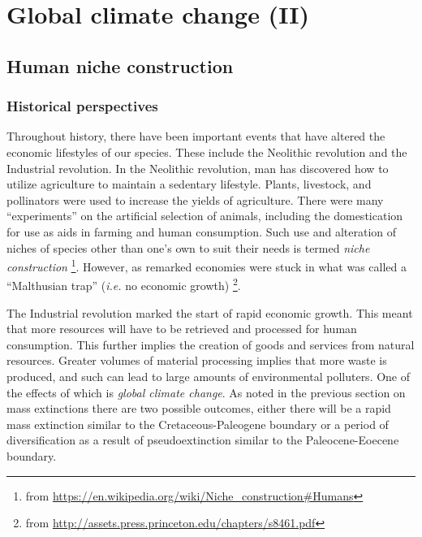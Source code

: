 \chapter{Global climate change (II)}



\section{Human niche construction}
\subsection{Historical perspectives}
Throughout history, there have been important events that have altered the economic lifestyles of our species.
These include the Neolithic revolution and the Industrial revolution.
In the Neolithic revolution, man has discovered how to utilize agriculture to maintain a sedentary lifestyle.
Plants, livestock, and pollinators were used to increase the yields of agriculture.
There were many ``experiments'' on the artificial selection of animals, including the domestication for use as aids in farming and human consumption.
Such use and alteration of niches of species other than one's own to suit their needs is termed \emph{niche construction}
\footnote{from \url{https://en.wikipedia.org/wiki/Niche_construction#Humans}}.
However, as remarked economies were stuck in what was called a ``Malthusian trap'' (\textit{i.e.} no economic growth)
\footnote{from \url{http://assets.press.princeton.edu/chapters/s8461.pdf}}.

The Industrial revolution marked the start of rapid economic growth.
This meant that more resources will have to be retrieved and processed for human consumption.
This further implies the creation of goods and services from natural resources.
Greater volumes of material processing implies that more waste is produced, and such can lead to large amounts of environmental polluters.
One of the effects of which is \emph{global climate change}.
As noted in the previous section on mass extinctions there are two possible outcomes, either there will be a rapid mass extinction similar to the Cretaceous-Paleogene boundary or a period of diversification as a result of pseudoextinction similar to the Paleocene-Eoecene boundary.

